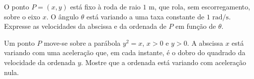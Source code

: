 \begin{exercicio}[19]
O ponto $P = (x, y)$ está fixo à roda de raio $1\text{ m}$, que rola, sem escorregamento, sobre o eixo $x$. O ângulo $\theta$ está variando a uma taxa constante de $1\text{ rad/s}$. Expresse as velocidades da abscissa e da ordenada de $P$ em função de $\theta$.
\begin{center}
\end{center}
\end{exercicio}

\begin{exercicio}[20]
Um ponto $P$ move-se sobre a parábola $y^2 = x$, $x > 0$ e $y > 0$. A abscissa $x$ está variando com uma aceleração que, em cada instante, é o dobro do quadrado da velocidade da ordenada $y$. Mostre que a ordenada está variando com aceleração nula.
\end{exercicio}

